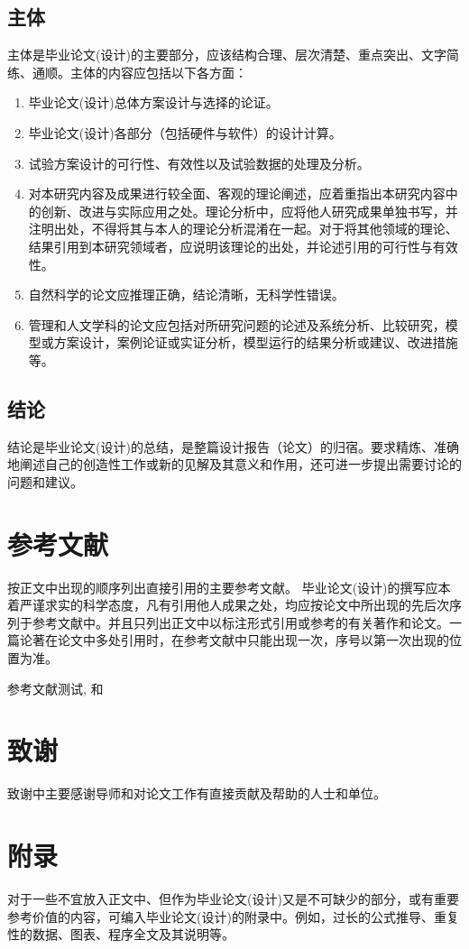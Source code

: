 \subsection{主体}
主体是毕业论文(设计)的主要部分，应该结构合理、层次清楚、重点突出、文字简练、通顺。主体的内容应包括以下各方面：
\begin{enumerate}
	\item 毕业论文(设计)总体方案设计与选择的论证。	
	\item 毕业论文(设计)各部分（包括硬件与软件）的设计计算。
	\item 试验方案设计的可行性、有效性以及试验数据的处理及分析。
	\item 对本研究内容及成果进行较全面、客观的理论阐述，应着重指出本研究内容中的创新、改进与实际应用之处。理论分析中，应将他人研究成果单独书写，并注明出处，不得将其与本人的理论分析混淆在一起。对于将其他领域的理论、结果引用到本研究领域者，应说明该理论的出处，并论述引用的可行性与有效性。
	\item 自然科学的论文应推理正确，结论清晰，无科学性错误。
	\item 管理和人文学科的论文应包括对所研究问题的论述及系统分析、比较研究，模型或方案设计，案例论证或实证分析，模型运行的结果分析或建议、改进措施等。
\end{enumerate}

\subsection{结论}
结论是毕业论文(设计)的总结，是整篇设计报告（论文）的归宿。要求精炼、准确地阐述自己的创造性工作或新的见解及其意义和作用，还可进一步提出需要讨论的问题和建议。
\section{参考文献}
按正文中出现的顺序列出直接引用的主要参考文献。
毕业论文(设计)的撰写应本着严谨求实的科学态度，凡有引用他人成果之处，均应按论文中所出现的先后次序列于参考文献中。并且只列出正文中以标注形式引用或参考的有关著作和论文。一篇论著在论文中多处引用时，在参考文献中只能出现一次，序号以第一次出现的位置为准。

参考文献测试\cite{jeong_velocity-gradient_2003}, 和\citet{xu_wall_2015}
\section{致谢}
致谢中主要感谢导师和对论文工作有直接贡献及帮助的人士和单位。
\section{附录}
对于一些不宜放入正文中、但作为毕业论文(设计)又是不可缺少的部分，或有重要参考价值的内容，可编入毕业论文(设计)的附录中。例如，过长的公式推导、重复性的数据、图表、程序全文及其说明等。




